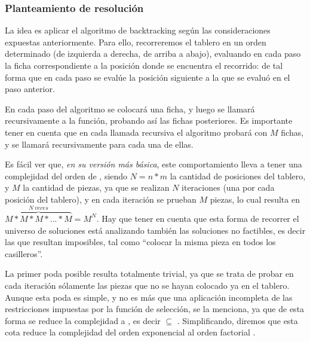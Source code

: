 \documentclass[11pt, a4paper, twoside]{article}
\begin{document}
\subsubsection{Planteamiento de resolución} 


La idea es aplicar el algoritmo de backtracking según las consideraciones expuestas anteriormente. Para ello, recorreremos el tablero en un orden determinado (de izquierda a derecha, de arriba a abajo), evaluando en cada paso la ficha correspondiente a la posición donde se encuentra el recorrido: de tal forma que en cada paso se evalúe la posición siguiente a la que se evaluó en el paso anterior.

En cada paso del algoritmo se colocará una ficha, y luego se llamará recursivamente a la función, probando así las fichas posteriores. Es importante tener en cuenta que en cada llamada recursiva el algoritmo probará con $M$ fichas, y se llamará recursivamente para cada una de ellas.

Es fácil ver que, \emph{en su versión más básica}, este comportamiento lleva a tener una complejidad del orden de , siendo $N=n*m$ la cantidad de posiciones del tablero, y $M$ la cantidad de piezas, ya que se realizan $N$ iteraciones (una por cada posición del tablero), y en cada iteración se prueban $M$ piezas, lo cual resulta en $\overbrace{M*M*M*...*M}^{N~veces} = M^N$. Hay que tener en cuenta que esta forma de recorrer el universo de soluciones está analizando también las soluciones no factibles, es decir las que resultan imposibles, tal como ``colocar la misma pieza en todos los casilleros''.


La primer poda posible resulta totalmente trivial, ya que se trata de probar en cada iteración sólamente las piezas que no se hayan colocado ya en el tablero. Aunque esta poda es simple, y no es más que una aplicación incompleta de las restricciones impuestas por la función de selección, se la menciona, ya que de esta forma se reduce la complejidad a , es decir  $\subseteq$ . Simplificando, diremos que esta cota reduce la complejidad del orden exponencial  al orden factorial .
\end{document}
